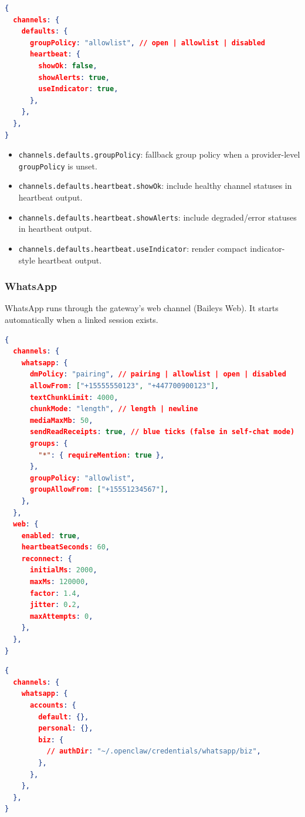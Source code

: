 \begin{lstlisting}[language=json]
{
  channels: {
    defaults: {
      groupPolicy: "allowlist", // open | allowlist | disabled
      heartbeat: {
        showOk: false,
        showAlerts: true,
        useIndicator: true,
      },
    },
  },
}
\end{lstlisting}


\begin{itemize}
  \item \texttt{channels.defaults.groupPolicy}: fallback group policy when a provider-level \texttt{groupPolicy} is unset.
  \item \texttt{channels.defaults.heartbeat.showOk}: include healthy channel statuses in heartbeat output.
  \item \texttt{channels.defaults.heartbeat.showAlerts}: include degraded/error statuses in heartbeat output.
  \item \texttt{channels.defaults.heartbeat.useIndicator}: render compact indicator-style heartbeat output.
\end{itemize}


\subsubsection{WhatsApp}


WhatsApp runs through the gateway's web channel (Baileys Web). It starts automatically when a linked session exists.

\begin{lstlisting}[language=json]
{
  channels: {
    whatsapp: {
      dmPolicy: "pairing", // pairing | allowlist | open | disabled
      allowFrom: ["+15555550123", "+447700900123"],
      textChunkLimit: 4000,
      chunkMode: "length", // length | newline
      mediaMaxMb: 50,
      sendReadReceipts: true, // blue ticks (false in self-chat mode)
      groups: {
        "*": { requireMention: true },
      },
      groupPolicy: "allowlist",
      groupAllowFrom: ["+15551234567"],
    },
  },
  web: {
    enabled: true,
    heartbeatSeconds: 60,
    reconnect: {
      initialMs: 2000,
      maxMs: 120000,
      factor: 1.4,
      jitter: 0.2,
      maxAttempts: 0,
    },
  },
}
\end{lstlisting}



\begin{lstlisting}[language=json]
{
  channels: {
    whatsapp: {
      accounts: {
        default: {},
        personal: {},
        biz: {
          // authDir: "~/.openclaw/credentials/whatsapp/biz",
        },
      },
    },
  },
}
\end{lstlisting}


